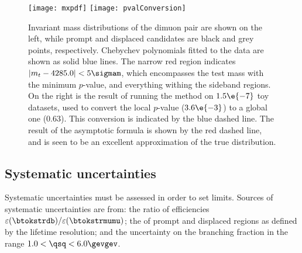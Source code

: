 \begin{figure}
  \begin{center}
    \texttt{[image: mxpdf]}
    \texttt{[image: pvalConversion]}
    \caption[dimuon mass distribution and $p$-value calculation]
    {
      Invariant mass distributions of the dimuon pair are shown on the left, while
      prompt and displaced candidates are black and grey points, respectively.
      Chebychev polynomials fitted to the data are shown as solid blue lines.
      The narrow red region indicates $|m_{t}-4285.0|<5\sigmam$, which encompasses the test mass
      with the minimum $p$-value, and everything withing the sideband regions.
      On the right is the result of running the method on $1.5\e{-7}$ toy datasets, used to convert
      the local $p$-value ($3.6\e{-3}$) to a global one (0.63). This conversion is indicated by the
      blue dashed line.
      The result of the asymptotic formula is shown by the red dashed line, and is seen to be an
      excellent approximation of the true distribution.
    }
    \label{fig:db:mumu}
  \end{center}
\end{figure}




\subsection{Systematic uncertainties}
Systematic uncertainties must be assessed in order to set limits.
Sources of systematic uncertainties are from:
the ratio of efficiencies $\varepsilon(\btokstrdb)/\varepsilon(\btokstrmumu)$;
the of prompt and displaced regions as defined by the lifetime resolution;
and the uncertainty on the \btokstrmumu branching fraction in the range $1.0<\qsq<6.0\gevgev$.



